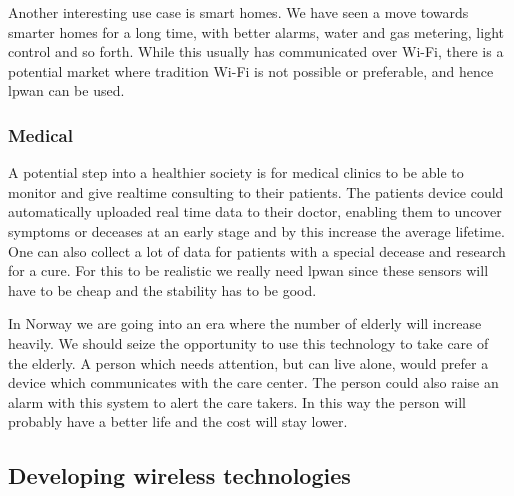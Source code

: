 \documentclass[USenglish]{ifimaster}  %
\begin{document}
Another interesting use case is smart homes. We have seen a move towards smarter homes for a long time, with better alarms, water and gas metering, light control and so forth. While this usually has communicated over Wi-Fi, there is a potential market where tradition Wi-Fi is not possible or preferable, and hence \acrshort{lpwan} can be used.

\subsubsection{Medical}
A potential step into a healthier society is for medical clinics to be able to monitor and give realtime consulting to their patients. The patients device could automatically uploaded real time data to their doctor, enabling them to uncover symptoms or deceases at an early stage and by this increase the average lifetime. One can also collect a lot of data for patients with a special decease and research for a cure. For this to be realistic we really need \acrshort{lpwan} since these sensors will have to be cheap and the stability has to be good.

In Norway we are going into an era where the number of elderly will increase heavily. We should seize the opportunity to use this technology to take care of the elderly. A person which needs attention, but can live alone, would prefer a device which communicates with the care center. The person could also raise an alarm with this system to alert the care takers. In this way the person will probably have a better life and the cost will stay lower.

\subsection{Developing wireless technologies} \label{ssection:wirelesstech}
\end{document}
